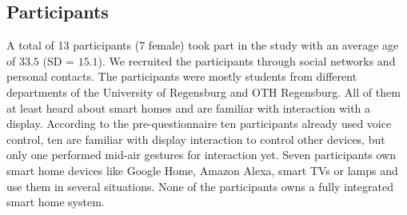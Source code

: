 \documentclass[sigchi]{acmart}
\begin{document}

\subsection{Participants}
A total of 13 participants (7 female) took part in the study with an average age of $33.5$ (SD = $15.1$). We recruited the participants through social networks and personal contacts. The participants were mostly students from different departments of the University of Regensburg and OTH Regensburg. All of them at least heard about smart homes and are familiar with interaction with a display. According to the pre-questionnaire ten participants already used voice control, ten are familiar with display interaction to control other devices, but only one performed mid-air gestures for interaction yet. Seven participants own smart home devices like Google Home, Amazon Alexa, smart TVs  or lamps and use them in several situations. None of the participants owns a fully integrated smart home system.
\end{document}
